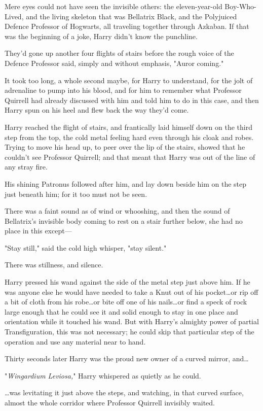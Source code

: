 Mere eyes could not have seen the invisible others: the eleven-year-old
Boy-Who-Lived, and the living skeleton that was Bellatrix Black, and the
Polyjuiced Defence Professor of Hogwarts, all traveling together through
Azkaban. If that was the beginning of a joke, Harry didn't know the punchline.

They'd gone up another four flights of stairs before the rough voice of the
Defence Professor said, simply and without emphasis, "Auror coming."

It took too long, a whole second maybe, for Harry to understand, for the jolt
of adrenaline to pump into his blood, and for him to remember what Professor
Quirrell had already discussed with him and told him to do in this case, and
then Harry spun on his heel and flew back the way they'd come.

Harry reached the flight of stairs, and frantically laid himself down on the
third step from the top, the cold metal feeling hard even through his cloak and
robes. Trying to move his head up, to peer over the lip of the stairs, showed
that he couldn't see Professor Quirrell; and that meant that Harry was out of
the line of any stray fire.

His shining Patronus followed after him, and lay down beside him on the step
just beneath him; for it too must not be seen.

There was a faint sound as of wind or whooshing, and then the sound of
Bellatrix's invisible body coming to rest on a stair further below, she had no
place in this except---

"Stay still," said the cold high whisper, "stay silent."

There was stillness, and silence.

Harry pressed his wand against the side of the metal step just above him. If he
was anyone else he would have needed to take a Knut out of his pocket…or
rip off a bit of cloth from his robe…or bite off one of his
nails…or find a speck of rock large enough that he could see it and
solid enough to stay in one place and orientation while it touched his wand.
But with Harry's almighty power of partial Transfiguration, this was not
necessary; he could skip that particular step of the operation and use any
material near to hand.

Thirty seconds later Harry was the proud new owner of a curved mirror,
and…

"\emph{Wingardium Leviosa,}" Harry whispered as quietly as he could.

…was levitating it just above the steps, and watching, in that curved
surface, almost the whole corridor where Professor Quirrell invisibly waited.


